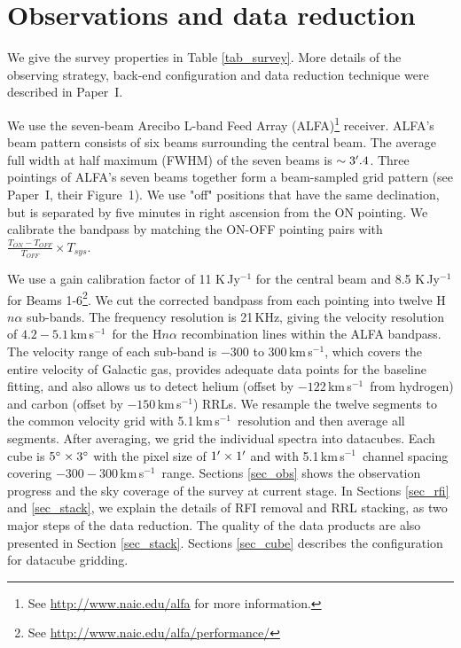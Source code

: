 \documentclass[manuscript]{aastex61}
\newcommand{\kms}{\,km\,s$^{-1}$}
\begin{document}
\section{Observations and data reduction} \label{sec_obs_data}

We give the survey properties in Table \ref{tab_survey}.
More details of the observing strategy, back-end configuration and data reduction technique were described in Paper~I.  

We use the seven-beam Arecibo L-band Feed Array (ALFA)\footnote{See \url{http://www.naic.edu/alfa} for more information.} receiver.
ALFA's beam pattern consists of six beams surrounding the central beam.
The average full width at half maximum (FWHM) of the seven beams is $\sim3\mbox{$^\prime$}.4$.
Three pointings of ALFA's seven beams together form a beam-sampled grid pattern (see Paper~I, their Figure~1).
We use "off" positions that have the same declination, but is separated by five minutes in right ascension from the ON pointing.
We calibrate the bandpass by matching the ON-OFF pointing pairs with $\frac{T_{ON}-T_{OFF}}{T_{OFF}}\times T_{sys}$.

We use a gain calibration factor of 11 K\,Jy$^{-1}$ for the central beam and 8.5 K\,Jy$^{-1}$ for Beams 1-6\footnote{See \url{http://www.naic.edu/alfa/performance/}}.
We cut the corrected bandpass from each pointing into twelve H$n\alpha$ sub-bands.
The frequency resolution is 21\,KHz, giving the velocity resolution of $4.2 - 5.1$\kms\ for the H$n\alpha$ recombination lines within the ALFA bandpass.  
The velocity range of each sub-band is $-300$ to 300\kms, which covers the entire velocity of Galactic gas, provides adequate data points for the baseline fitting, and also allows us to detect helium (offset by $-122$\kms\ from hydrogen) and carbon (offset by $-150$\kms) RRLs.
We resample the twelve segments to the common velocity grid with 5.1\kms\ resolution and then average all segments.
After averaging, we grid the individual spectra into datacubes.  
Each cube is $5\mbox{$^\circ$} \times 3\mbox{$^\circ$}$ with the pixel size of $1\mbox{$^\prime$} \times 1 \mbox{$^\prime$}$ and with 5.1\kms\ channel spacing covering $-300 - 300$\kms\ range.
Sections \ref{sec_obs} shows the observation progress and the sky coverage of the survey at current stage.
In Sections \ref{sec_rfi} and \ref{sec_stack}, we explain the details of RFI removal and RRL stacking, as two major steps of the data reduction.
The quality of the data products are also presented in Section \ref{sec_stack}.
Sections \ref{sec_cube} describes the configuration for datacube gridding.
\end{document}
